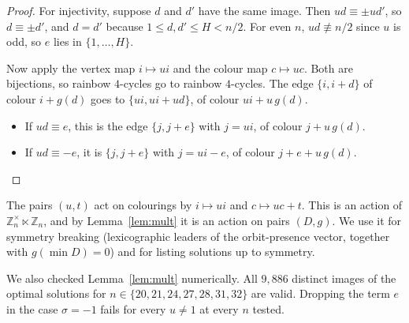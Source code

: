 \documentclass[11pt]{amsart}
\theoremstyle{definition}
\newcommand{\Z}{\mathbb{Z}}
\begin{document}
\begin{proof}
For injectivity, suppose $d$ and $d'$ have the same image. Then $ud\equiv\pm ud'$, so
$d\equiv\pm d'$, and $d=d'$ because $1\le d,d'\le H<n/2$. For even $n$, $ud\not\equiv n/2$
since $u$ is odd, so $e$ lies in $\{1,\dots,H\}$.

Now apply the vertex map $i\mapsto ui$ and the colour map $c\mapsto uc$. Both are
bijections, so rainbow $4$-cycles go to rainbow $4$-cycles. The edge $\{i,i+d\}$ of colour
$i+g(d)$ goes to $\{ui,ui+ud\}$, of colour $ui+u\,g(d)$.
\begin{itemize}
\item If $ud\equiv e$, this is the edge $\{j,j+e\}$ with $j=ui$, of colour $j+u\,g(d)$.
\item If $ud\equiv -e$, it is $\{j,j+e\}$ with $j=ui-e$, of colour $j+e+u\,g(d)$.
\end{itemize}
\end{proof}

The pairs $(u,t)$ act on colourings by $i\mapsto ui$ and $c\mapsto uc+t$. This is an action
of $\Z_n^\times\ltimes\Z_n$, and by Lemma~\ref{lem:mult} it is an action on pairs $(D,g)$. We
use it for symmetry breaking (lexicographic leaders of the orbit-presence vector, together
with $g(\min D)=0$) and for listing solutions up to symmetry.

We also checked Lemma~\ref{lem:mult} numerically. All $9{,}886$ distinct images of the
optimal solutions for $n\in\{20,21,24,27,28,31,32\}$ are valid. Dropping the term $e$ in the
case $\sigma=-1$ fails for every $u\ne1$ at every $n$ tested.
\end{document}
